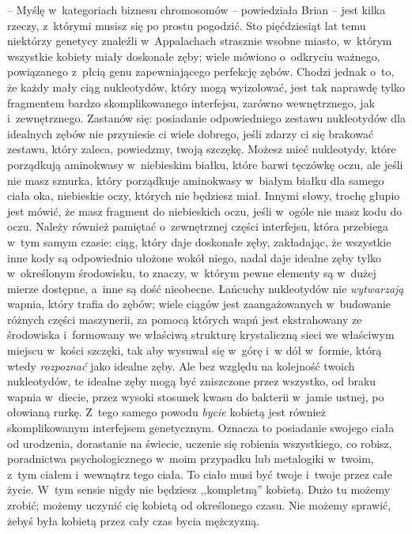 \documentclass[oneside,polish,11pt,rmheadings]{mwbk}
\begin{document}
-- Myślę w~kategoriach biznesu chromosomów -- powiedziała Brian -- jest kilka rzeczy, z~którymi musisz się po prostu pogodzić. Sto pięćdziesiąt lat temu niektórzy genetycy znaleźli w~Appalachach strasznie wsobne miasto, w~którym wszystkie kobiety miały doskonałe zęby; wiele mówiono o~odkryciu ważnego, powiązanego z~płcią genu zapewniającego perfekcję zębów. Chodzi jednak o~to, że każdy mały ciąg nukleotydów, który mogą wyizolować, jest tak naprawdę tylko fragmentem bardzo skomplikowanego interfejsu, zarówno wewnętrznego, jak i~zewnętrznego. Zastanów się: posiadanie odpowiedniego zestawu nukleotydów dla idealnych zębów nie przyniesie ci wiele dobrego, jeśli zdarzy ci się brakować zestawu, który zaleca, powiedzmy, twoją szczękę. Możesz mieć nukleotydy, które porządkują aminokwasy w~niebieskim białku, które barwi tęczówkę oczu, ale jeśli nie masz sznurka, który porządkuje aminokwasy w~białym białku dla samego ciała oka, niebieskie oczy, których nie będziesz miał. Innymi słowy, trochę głupio jest mówić, że masz fragment do niebieskich oczu, jeśli w~ogóle nie masz kodu do oczu. Należy również pamiętać o~zewnętrznej części interfejsu, która przebiega w~tym samym czasie: ciąg, który daje doskonałe zęby, zakładając, że wszystkie inne kody są odpowiednio ułożone wokół niego, nadal daje idealne zęby tylko w~określonym środowisku, to znaczy, w~którym pewne elementy są w~dużej mierze dostępne, a~inne są dość nieobecne. Łańcuchy nukleotydów nie \textit{wytwarzają }wapnia, który trafia do zębów; wiele ciągów jest zaangażowanych w~budowanie różnych części maszynerii, za pomocą których wapń jest ekstrahowany ze środowiska i~formowany we właściwą strukturę krystaliczną sieci we właściwym miejscu w~kości szczęki, tak aby wysuwał się w~górę i~w dół w~formie, którą wtedy \textit{rozpoznać }jako idealne zęby. Ale bez względu na kolejność twoich nukleotydów, te idealne zęby mogą być zniszczone przez wszystko, od braku wapnia w~diecie, przez wysoki stosunek kwasu do bakterii w~jamie ustnej, po ołowianą rurkę. Z~tego samego powodu \textit{bycie }kobietą jest również skomplikowanym interfejsem genetycznym. Oznacza to posiadanie swojego ciała od urodzenia, dorastanie na świecie, uczenie się robienia wszystkiego, co robisz, poradnictwa psychologicznego w~moim przypadku lub metalogiki w~twoim, z~tym ciałem i~wewnątrz tego ciała. To ciało musi być twoje i~twoje przez całe życie. W~tym sensie nigdy nie będziesz ,,kompletną'' kobietą. Dużo tu możemy zrobić; możemy uczynić cię kobietą od określonego czasu. Nie możemy sprawić, żebyś była kobietą przez cały czas bycia mężczyzną. 
\end{document}
